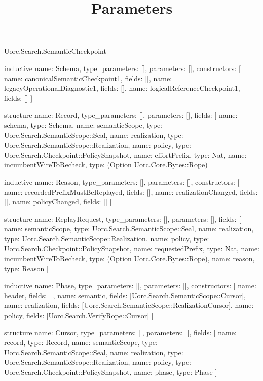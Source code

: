 \begin{lexlean}{Uorc.Search.SemanticCheckpoint}
\title{Parameters}
\begin{semanticmodule}
inductive{
  name: Schema,
  type_parameters: [],
  parameters: [],
  constructors: [
    {name: canonicalSemanticCheckpoint1, fields: []},
    {name: legacyOperationalDiagnostic1, fields: []},
    {name: logicalReferenceCheckpoint1, fields: []}
  ]
}

structure{
  name: Record,
  type_parameters: [],
  parameters: [],
  fields: [
    {name: schema, type: Schema},
    {name: semanticScope, type: Uorc.Search.SemanticScope::Seal},
    {name: realization, type: Uorc.Search.SemanticScope::Realization},
    {name: policy, type: Uorc.Search.Checkpoint::PolicySnapshot},
    {name: effortPrefix, type: Nat},
    {name: incumbentWireToRecheck, type: (Option Uorc.Core.Bytes::Rope)}
  ]
}

inductive{
  name: Reason,
  type_parameters: [],
  parameters: [],
  constructors: [
    {name: recordedPrefixMustBeReplayed, fields: []},
    {name: realizationChanged, fields: []},
    {name: policyChanged, fields: []}
  ]
}

structure{
  name: ReplayRequest,
  type_parameters: [],
  parameters: [],
  fields: [
    {name: semanticScope, type: Uorc.Search.SemanticScope::Seal},
    {name: realization, type: Uorc.Search.SemanticScope::Realization},
    {name: policy, type: Uorc.Search.Checkpoint::PolicySnapshot},
    {name: requestedPrefix, type: Nat},
    {name: incumbentWireToRecheck, type: (Option Uorc.Core.Bytes::Rope)},
    {name: reason, type: Reason}
  ]
}

inductive{
  name: Phase,
  type_parameters: [],
  parameters: [],
  constructors: [
    {name: header, fields: []},
    {name: semantic, fields: [Uorc.Search.SemanticScope::Cursor]},
    {name: realization, fields: [Uorc.Search.SemanticScope::RealizationCursor]},
    {name: policy, fields: [Uorc.Search.VerifyRope::Cursor]}
  ]
}

structure{
  name: Cursor,
  type_parameters: [],
  parameters: [],
  fields: [
    {name: record, type: Record},
    {name: semanticScope, type: Uorc.Search.SemanticScope::Seal},
    {name: realization, type: Uorc.Search.SemanticScope::Realization},
    {name: policy, type: Uorc.Search.Checkpoint::PolicySnapshot},
    {name: phase, type: Phase}
  ]
}


\end{semanticmodule}
\end{lexlean}
